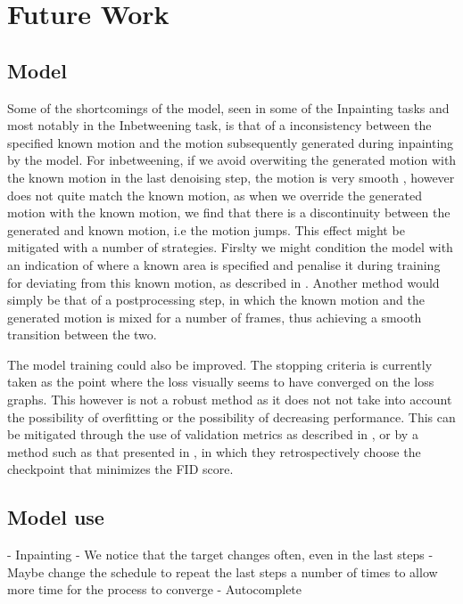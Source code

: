 \section{Future Work}
\label{sec:future_work}

\subsection{Model}
Some of the shortcomings of the model, seen in some of the Inpainting tasks and most notably in the Inbetweening task, is that of a inconsistency between the specified known motion and the motion subsequently generated during inpainting by the model. For inbetweening, if we avoid overwiting the generated motion with the known motion in the last denoising step, the motion is very smooth , however does not quite match the known motion, as when we override the generated motion with the known motion, we find that there is a discontinuity between the generated and known motion, i.e the motion jumps. This effect might be mitigated with a number of strategies. Firslty we might condition the model with an indication of where a known area is specified and penalise it during training for deviating from this known motion, as described in . Another method would simply be that of a postprocessing step, in which the known motion and the generated motion is mixed for a number of frames, thus achieving a smooth transition between the two.

The model training could also be improved. The stopping criteria is currently taken as the point where the loss visually seems to have converged on the loss graphs. This however is not a robust method as it does not not take into account the possibility of overfitting or the possibility of decreasing performance. This can be mitigated through the use of validation metrics as described in , or by a method such as that presented in \cite{MDM}, in which they retrospectively choose the checkpoint that minimizes the FID score.

\subsection{Model use}


- Inpainting
    - We notice that the target changes often, even in the last steps
    - Maybe change the schedule to repeat the last steps a number of times to allow more time for the process to converge
- Autocomplete

